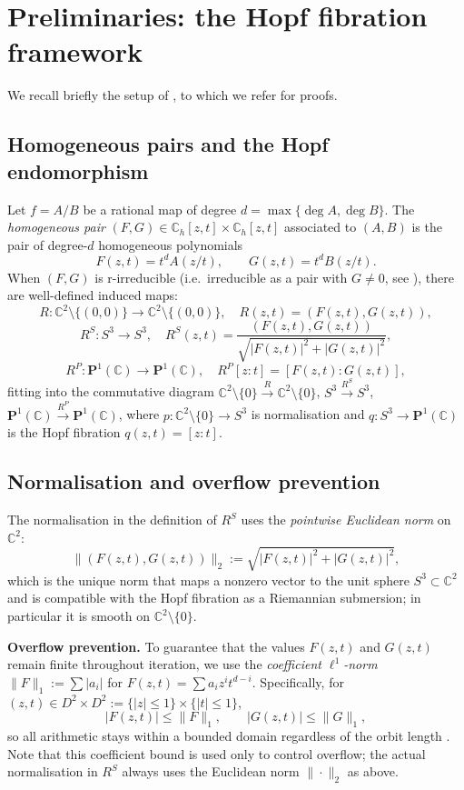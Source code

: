 \documentclass[12pt]{article}
\theoremstyle{definition}
\newcommand{\C}{\mathbb{C}}
\newcommand{\Pone}{\mathbf{P}^1(\C)}
\newcommand{\Sthree}{S^3}
\newcommand{\RS}{R^S}
\newcommand{\RP}{R^P}
\begin{document}
\section{Preliminaries: the Hopf fibration framework}
\label{sec:prelim}

We recall briefly the setup of \cite{Alvarez2023}, to which we refer for
proofs.

\subsection{Homogeneous pairs and the Hopf endomorphism}

Let $f = A/B$ be a rational map of degree $d = \max\{\deg A, \deg B\}$.
The \emph{homogeneous pair} $(F,G) \in \C_h[z,t]\times\C_h[z,t]$
associated to $(A,B)$ is the pair of degree-$d$ homogeneous polynomials
\[
  F(z,t) = t^d A(z/t), \qquad G(z,t) = t^d B(z/t).
\]
When $(F,G)$ is r-irreducible (i.e.~irreducible as a pair with $G \ne 0$,
see \cite[Def.~12]{Alvarez2023}), there are well-defined induced maps:
\[
  R:\C^2\setminus\{(0,0)\}\to\C^2\setminus\{(0,0)\},\quad
  R(z,t) = (F(z,t),G(z,t)),
\]
\[
  \RS:\Sthree\to\Sthree,\quad
  \RS(z,t) = \frac{(F(z,t),G(z,t))}{\sqrt{|F(z,t)|^2+|G(z,t)|^2}},
\]
\[
  \RP:\Pone\to\Pone,\quad \RP[z:t]=[F(z,t):G(z,t)],
\]
fitting into the commutative diagram
$\C^2\setminus\{0\}\xrightarrow{R}\C^2\setminus\{0\}$,
$\Sthree\xrightarrow{\RS}\Sthree$, $\Pone\xrightarrow{\RP}\Pone$,
where $p:\C^2\setminus\{0\}\to\Sthree$ is normalisation and
$q:\Sthree\to\Pone$ is the Hopf fibration $q(z,t) = [z:t]$.

\subsection{Normalisation and overflow prevention}

The normalisation in the definition of $\RS$ uses the
\emph{pointwise Euclidean norm} on $\C^2$:
\[
  \|(F(z,t),G(z,t))\|_2 := \sqrt{|F(z,t)|^2+|G(z,t)|^2},
\]
which is the unique norm that maps a nonzero vector to the unit sphere
$S^3 \subset \C^2$ and is compatible with the Hopf fibration as a
Riemannian submersion; in particular it is smooth on $\C^2\setminus\{0\}$.

\medskip\noindent
\textbf{Overflow prevention.}
To guarantee that the values $F(z,t)$ and $G(z,t)$ remain finite
throughout iteration, we use the \emph{coefficient $\ell^1$-norm}
$\|F\|_1 := \sum |a_i|$ for $F(z,t) = \sum a_i z^i t^{d-i}$.
Specifically, for $(z,t) \in D^2 \times D^2 := \{|z|\le 1\}\times\{|t|\le
1\}$,
\begin{equation}\label{eq:eval_bound}
  |F(z,t)| \le \|F\|_1, \qquad |G(z,t)| \le \|G\|_1,
\end{equation}
so all arithmetic stays within a bounded domain regardless of the orbit
length \cite[Prop.~2]{Alvarez2023}.  Note that this coefficient bound is
used only to control overflow; the actual normalisation in $\RS$ always
uses the Euclidean norm $\|\cdot\|_2$ as above.
\end{document}
